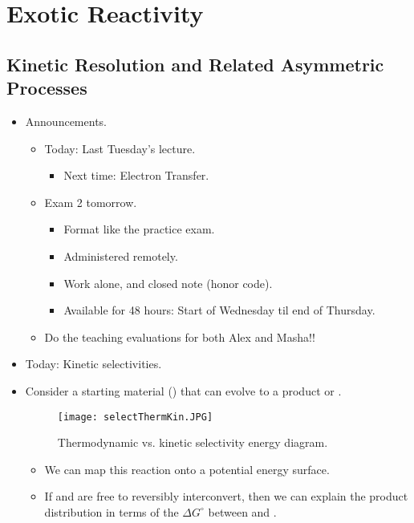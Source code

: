 \documentclass[../notes.tex]{subfiles}
\begin{document}
\chapter{Exotic Reactivity}
\section{Kinetic Resolution and Related Asymmetric Processes}
\begin{itemize}
    \item {}Announcements.
    \begin{itemize}
        \item Today: Last Tuesday's lecture.
        \begin{itemize}
            \item Next time: Electron Transfer.
        \end{itemize}
        \item Exam 2 tomorrow.
        \begin{itemize}
            \item Format like the practice exam.
            \item Administered remotely.
            \item Work alone, and closed note (honor code).
            \item Available for 48 hours: Start of Wednesday til end of Thursday.
        \end{itemize}
        \item Do the teaching evaluations for both Alex and Masha!!
    \end{itemize}
    \item Today: Kinetic selectivities.
    \item Consider a starting material () that can evolve to a product  or .
    \begin{figure}[h!]
        \centering
        \texttt{[image: selectThermKin.JPG]}
        \caption{Thermodynamic vs. kinetic selectivity energy diagram.}
        \label{fig:selectThermKin}
    \end{figure}
    \begin{itemize}
        \item We can map this reaction onto a potential energy surface.
        \item If  and  are free to reversibly interconvert, then we can explain the product distribution in terms of the $\Delta G^\circ$ between  and .
        \begin{itemize}

\end{itemize}
\end{itemize}
\end{itemize}
\end{document}

